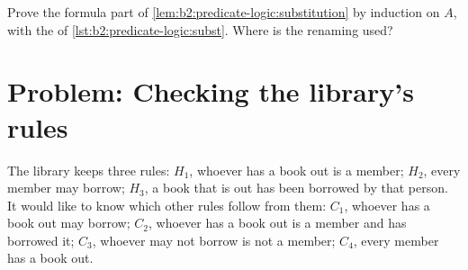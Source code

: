 \begin{exercise}[$\star\star\star$]\label{exo:b2:predicate-logic:12}
Prove the formula part of \cref{lem:b2:predicate-logic:substitution} by induction on $A$, with the  of
\cref{lst:b2:predicate-logic:subst}. Where is the renaming used?
\end{exercise}

\section{Problem: Checking the library's rules}\label{sec:b2:predicate-logic:problem}

\begin{problem}\label{pb:b2:predicate-logic:1}
The library keeps three rules: $H_1$, whoever has a book out is a member; $H_2$, every member may borrow; $H_3$, a book
that is out has been borrowed by that person. It would like to know which other rules follow from them: $C_1$, whoever
has a book out may borrow; $C_2$, whoever has a book out is a member and has borrowed it; $C_3$, whoever may not borrow
is not a member; $C_4$, every member has a book out.

\label{lst:b2:predicate-logic:library}

\label{out:b2:predicate-logic:library}


\end{problem}
